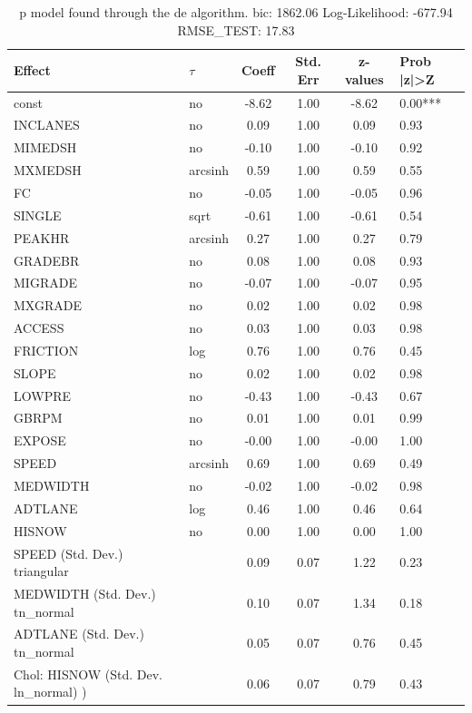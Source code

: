 \begin{table}
	\caption{p model found through the de algorithm. bic: 1862.06 Log-Likelihood: -677.94 RMSE_TEST: 17.83}
	\begin{center}
		\begin{tabular}{|l|l|c|c|c|l|}
			\hline
			Effect & $\tau$ & Coeff & Std. Err & z-values & Prob |z|>Z \\
			\hline
			const & no & -8.62 & 1.00 & -8.62 & 0.00*** \\
			\hline
			INCLANES & no & 0.09 & 1.00 & 0.09 & 0.93 \\
			\hline
			MIMEDSH & no & -0.10 & 1.00 & -0.10 & 0.92 \\
			\hline
			MXMEDSH & arcsinh & 0.59 & 1.00 & 0.59 & 0.55 \\
			\hline
			FC & no & -0.05 & 1.00 & -0.05 & 0.96 \\
			\hline
			SINGLE & sqrt & -0.61 & 1.00 & -0.61 & 0.54 \\
			\hline
			PEAKHR & arcsinh & 0.27 & 1.00 & 0.27 & 0.79 \\
			\hline
			GRADEBR & no & 0.08 & 1.00 & 0.08 & 0.93 \\
			\hline
			MIGRADE & no & -0.07 & 1.00 & -0.07 & 0.95 \\
			\hline
			MXGRADE & no & 0.02 & 1.00 & 0.02 & 0.98 \\
			\hline
			ACCESS & no & 0.03 & 1.00 & 0.03 & 0.98 \\
			\hline
			FRICTION & log & 0.76 & 1.00 & 0.76 & 0.45 \\
			\hline
			SLOPE & no & 0.02 & 1.00 & 0.02 & 0.98 \\
			\hline
			LOWPRE & no & -0.43 & 1.00 & -0.43 & 0.67 \\
			\hline
			GBRPM & no & 0.01 & 1.00 & 0.01 & 0.99 \\
			\hline
			EXPOSE & no & -0.00 & 1.00 & -0.00 & 1.00 \\
			\hline
			SPEED & arcsinh & 0.69 & 1.00 & 0.69 & 0.49 \\
			\hline
			MEDWIDTH & no & -0.02 & 1.00 & -0.02 & 0.98 \\
			\hline
			ADTLANE & log & 0.46 & 1.00 & 0.46 & 0.64 \\
			\hline
			HISNOW & no & 0.00 & 1.00 & 0.00 & 1.00 \\
			\hline
			SPEED (Std. Dev.) triangular &  & 0.09 & 0.07 & 1.22 & 0.23 \\
			\hline
			MEDWIDTH (Std. Dev.) tn_normal &  & 0.10 & 0.07 & 1.34 & 0.18 \\
			\hline
			ADTLANE (Std. Dev.) tn_normal &  & 0.05 & 0.07 & 0.76 & 0.45 \\
			\hline
			 Chol: HISNOW (Std. Dev. ln_normal) ) &  & 0.06 & 0.07 & 0.79 & 0.43 \\
			\hline
		\end{tabular}
	\end{center}
\end{table}